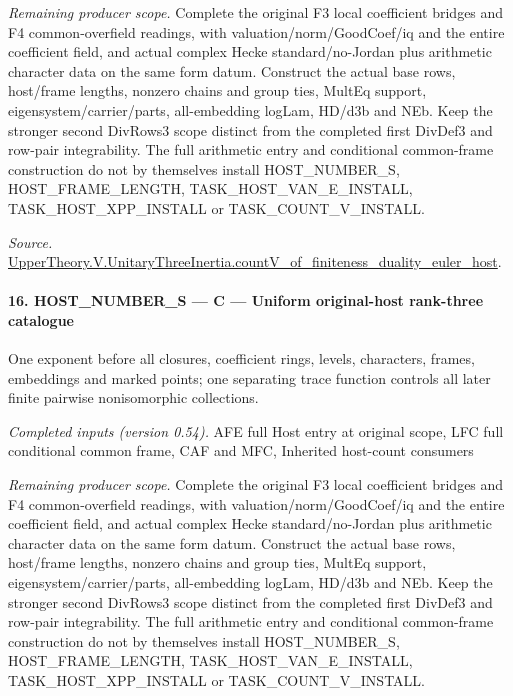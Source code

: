 \documentclass[11pt,a4paper]{article}
\numberwithin{equation}{section}
\theoremstyle{remark}\newtheorem{remark}[theorem]{Remark}
\begin{document}
\emph{Remaining producer scope.} Complete the original F3 local coefficient bridges and F4 common-overfield readings, with valuation/norm/GoodCoef/iq and the entire coefficient field, and actual complex Hecke standard/no-Jordan plus arithmetic character data on the same form datum. Construct the actual base rows, host/frame lengths, nonzero chains and group ties, MultEq support, eigensystem/carrier/parts, all-embedding logLam, HD/d3b and NEb. Keep the stronger second DivRows3 scope distinct from the completed first DivDef3 and row-pair integrability. The full arithmetic entry and conditional common-frame construction do not by themselves install HOST\_\allowbreak NUMBER\_\allowbreak S, HOST\_\allowbreak FRAME\_\allowbreak LENGTH, TASK\_\allowbreak HOST\_\allowbreak VAN\_\allowbreak E\_\allowbreak INSTALL, TASK\_\allowbreak HOST\_\allowbreak XPP\_\allowbreak INSTALL or TASK\_\allowbreak COUNT\_\allowbreak V\_\allowbreak INSTALL.

\emph{Source.} \href{https://github.com/CocoSgt/riemann-hypothesis-lean/blob/7cbf7a0c32fca1badf05931879a37c3f8a2b03b4/src/Development/AutomorphicArithmetic/AutomorphicVarieties/ModularityArgument/ThresholdArguments/DenseThresholdCases/CountVOf.lean#L33-L60}{UpperTheory.V.UnitaryThreeInertia.countV\_\allowbreak of\_\allowbreak finiteness\_\allowbreak duality\_\allowbreak euler\_\allowbreak host}.



\paragraph{16. HOST\_\allowbreak NUMBER\_\allowbreak S — C — Uniform original-host rank-three catalogue}

One exponent before all closures, coefficient rings, levels, characters, frames, embeddings and marked points; one separating trace function controls all later finite pairwise nonisomorphic collections.

\emph{Completed inputs (version 0.54).} AFE full Host entry at original scope, LFC full conditional common frame, CAF and MFC, Inherited host-count consumers

\emph{Remaining producer scope.} Complete the original F3 local coefficient bridges and F4 common-overfield readings, with valuation/norm/GoodCoef/iq and the entire coefficient field, and actual complex Hecke standard/no-Jordan plus arithmetic character data on the same form datum. Construct the actual base rows, host/frame lengths, nonzero chains and group ties, MultEq support, eigensystem/carrier/parts, all-embedding logLam, HD/d3b and NEb. Keep the stronger second DivRows3 scope distinct from the completed first DivDef3 and row-pair integrability. The full arithmetic entry and conditional common-frame construction do not by themselves install HOST\_\allowbreak NUMBER\_\allowbreak S, HOST\_\allowbreak FRAME\_\allowbreak LENGTH, TASK\_\allowbreak HOST\_\allowbreak VAN\_\allowbreak E\_\allowbreak INSTALL, TASK\_\allowbreak HOST\_\allowbreak XPP\_\allowbreak INSTALL or TASK\_\allowbreak COUNT\_\allowbreak V\_\allowbreak INSTALL.
\end{document}
